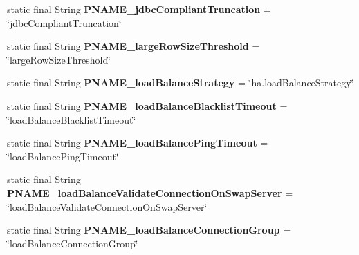 \begin{DoxyCompactItemize}
\mbox{\label{classcom_1_1mysql_1_1cj_1_1conf_1_1_property_definitions_a7aa492f479eb836e3c018288164bab8e}} 
static final String {\bfseries P\+N\+A\+M\+E\+\_\+jdbc\+Compliant\+Truncation} = \char`\"{}jdbc\+Compliant\+Truncation\char`\"{}
\item 
\mbox{\label{classcom_1_1mysql_1_1cj_1_1conf_1_1_property_definitions_a318c760adb6f0a412f84e1099981f52c}} 
static final String {\bfseries P\+N\+A\+M\+E\+\_\+large\+Row\+Size\+Threshold} = \char`\"{}large\+Row\+Size\+Threshold\char`\"{}
\item 
\mbox{\label{classcom_1_1mysql_1_1cj_1_1conf_1_1_property_definitions_a424755d9ad4d03c2ec265f04011dc434}} 
static final String {\bfseries P\+N\+A\+M\+E\+\_\+load\+Balance\+Strategy} = \char`\"{}ha.\+load\+Balance\+Strategy\char`\"{}
\item 
\mbox{\label{classcom_1_1mysql_1_1cj_1_1conf_1_1_property_definitions_a923a66c4faf2ac3c3462e09cf812e25e}} 
static final String {\bfseries P\+N\+A\+M\+E\+\_\+load\+Balance\+Blacklist\+Timeout} = \char`\"{}load\+Balance\+Blacklist\+Timeout\char`\"{}
\item 
\mbox{\label{classcom_1_1mysql_1_1cj_1_1conf_1_1_property_definitions_a3e1a704709f3df18a1d560019c5b6037}} 
static final String {\bfseries P\+N\+A\+M\+E\+\_\+load\+Balance\+Ping\+Timeout} = \char`\"{}load\+Balance\+Ping\+Timeout\char`\"{}
\item 
\mbox{\label{classcom_1_1mysql_1_1cj_1_1conf_1_1_property_definitions_abf0b7a75dd3ecfe1c9d1ac1999b8a8ad}} 
static final String {\bfseries P\+N\+A\+M\+E\+\_\+load\+Balance\+Validate\+Connection\+On\+Swap\+Server} = \char`\"{}load\+Balance\+Validate\+Connection\+On\+Swap\+Server\char`\"{}
\item 
\mbox{\label{classcom_1_1mysql_1_1cj_1_1conf_1_1_property_definitions_a7fd59b540926d71449dc767ab16c67e0}} 
static final String {\bfseries P\+N\+A\+M\+E\+\_\+load\+Balance\+Connection\+Group} = \char`\"{}load\+Balance\+Connection\+Group\char`\"{}

\end{DoxyCompactItemize}

